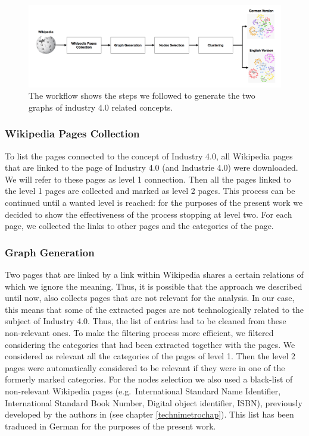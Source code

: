 \documentclass[b5paper,]{book}
\theoremstyle{definition}
\theoremstyle{definition}
\theoremstyle{definition}
\theoremstyle{remark}
\begin{document}
\begin{figure}

{\centering \includegraphics[width=1\linewidth]{_bookdown_files/figures/industrie_wf} 

}

\caption{The workflow shows the steps we followed to generate the two graphs of industry 4.0 related concepts.}\label{fig:industriewf}
\end{figure}

\subsubsection*{Wikipedia Pages
Collection}\label{wikipedia-pages-collection}

To list the pages connected to the concept of Industry 4.0, all
Wikipedia pages that are linked to the page of Industry 4.0 (and
Industrie 4.0) were downloaded. We will refer to these pages as level 1
connection. Then all the pages linked to the level 1 pages are collected
and marked as level 2 pages. This process can be continued until a
wanted level is reached: for the purposes of the present work we decided
to show the effectiveness of the process stopping at level two. For each
page, we collected the links to other pages and the categories of the
page.

\subsubsection*{Graph Generation}\label{graph-generation}

Two pages that are linked by a link within Wikipedia shares a certain
relations of which we ignore the meaning. Thus, it is possible that the
approach we described until now, also collects pages that are not
relevant for the analysis. In our case, this means that some of the
extracted pages are not technologically related to the subject of
Industry 4.0. Thus, the list of entries had to be cleaned from these
non-relevant ones. To make the filtering process more efficient, we
filtered considering the categories that had been extracted together
with the pages. We considered as relevant all the categories of the
pages of level 1. Then the level 2 pages were automatically considered
to be relevant if they were in one of the formerly marked categories.
For the nodes selection we also used a black-list of non-relevant
Wikipedia pages (e.g.~International Standard Name Identifier,
International Standard Book Number, Digital object identifier, ISBN),
previously developed by the authors in (see chapter
\ref{technimetrochap}). This list has been traduced in German for the
purposes of the present work.
\end{document}

